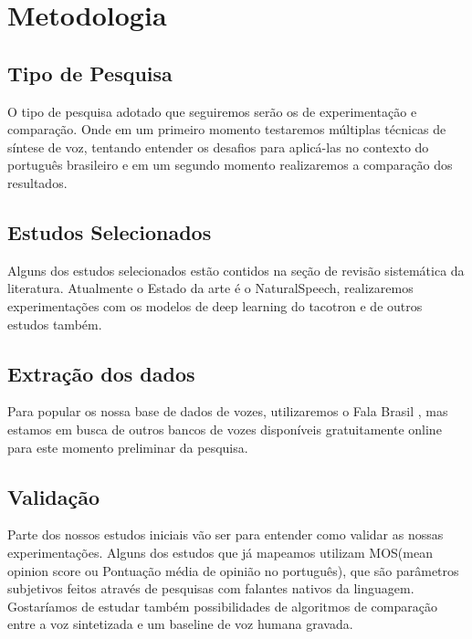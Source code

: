 \documentclass[a4paper,12pt]{article}
\begin{document}
	
	\section{Metodologia}
		\subsection{Tipo de Pesquisa}
		O tipo de pesquisa adotado que seguiremos serão os de experimentação e comparação. Onde em um primeiro momento testaremos múltiplas técnicas de síntese de voz, tentando entender os desafios para aplicá-las no contexto do português brasileiro e em um segundo momento realizaremos a comparação dos resultados.
		
		\subsection{Estudos Selecionados}
		Alguns dos estudos selecionados estão contidos na seção de revisão sistemática da literatura. Atualmente o Estado da arte é o NaturalSpeech, realizaremos experimentações com os modelos de deep learning do tacotron e de outros estudos também.
		
		\subsection{Extração dos dados}
		Para popular os nossa base de dados de vozes, utilizaremos o Fala Brasil \cite{falabrasil}, mas estamos em busca de outros bancos de vozes disponíveis gratuitamente online para este momento preliminar da pesquisa.

		\subsection{Validação}
		Parte dos nossos estudos iniciais vão ser para entender como validar as nossas experimentações. Alguns dos estudos que já mapeamos utilizam MOS(mean opinion score ou Pontuação média de opinião no português), que são parâmetros subjetivos feitos através de pesquisas com falantes nativos da linguagem. Gostaríamos de estudar também possibilidades de algoritmos de comparação entre a voz sintetizada e um baseline de voz humana gravada.
	
	
	
\end{document}
